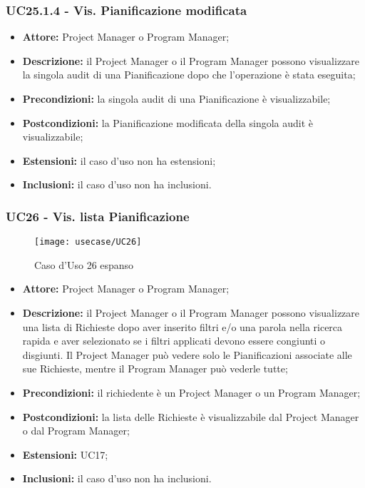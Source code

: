 \subsubsection*{UC25.1.4 - Vis. Pianificazione modificata}

\begin{itemize}[label=$\circ$]
\item \textbf{Attore:} Project Manager o Program Manager;
\item \textbf{Descrizione:} il Project Manager o il Program Manager possono visualizzare la
singola audit di una Pianificazione dopo che l’operazione è stata eseguita;
\item \textbf{Precondizioni:} la singola audit di una Pianificazione è visualizzabile;
\item \textbf{Postcondizioni:} la Pianificazione modificata della singola audit è visualizzabile;
\item \textbf{Estensioni:} il caso d'uso non ha estensioni;
\item \textbf{Inclusioni:} il caso d'uso non ha inclusioni.
\end{itemize}

\subsubsection*{UC26 - Vis. lista Pianificazione}
\begin{figure}[H] 
	\centering
    \texttt{[image: usecase/UC26]} 
    \caption{Caso d'Uso 26 espanso}
\end{figure}

\begin{itemize}[label=$\circ$]
\item \textbf{Attore:}  Project Manager o Program Manager;
\item \textbf{Descrizione:} il Project Manager o il Program Manager possono visualizzare
una lista di Richieste dopo aver inserito filtri e/o una parola nella ricerca rapida
e aver selezionato se i filtri applicati devono essere congiunti o disgiunti. Il Project Manager può vedere solo le Pianificazioni associate alle sue Richieste, mentre il Program Manager può vederle tutte;
\item \textbf{Precondizioni:} il richiedente è un Project Manager o un Program Manager;
\item \textbf{Postcondizioni:} la lista delle Richieste è visualizzabile dal Project Manager o dal Program Manager;
\item \textbf{Estensioni:} UC17;
\item \textbf{Inclusioni:} il caso d'uso non ha inclusioni.
\end{itemize}


